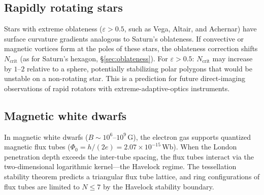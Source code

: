 \subsection{Rapidly rotating stars}

Stars with extreme oblateness ($\varepsilon > 0.5$, such as
Vega, Altair, and Achernar) have surface curvature gradients
analogous to Saturn's oblateness.  If convective or magnetic
vortices form at the poles of these stars, the oblateness
correction shifts $N_{\mathrm{crit}}$ (as for Saturn's hexagon,
\S\ref{sec:oblateness}).  For $\varepsilon > 0.5$:
$N_{\mathrm{crit}}$ may increase by $1$--$2$ relative to a
sphere, potentially stabilizing polar polygons that would be
unstable on a non-rotating star.
This is a prediction for future direct-imaging observations
of rapid rotators with extreme-adaptive-optics instruments.

\subsection{Magnetic white dwarfs}

In magnetic white dwarfs ($B \sim 10^6$--$10^9$\,G), the
electron gas supports quantized magnetic flux tubes
($\Phi_0 = h/(2e) = 2.07 \times 10^{-15}$\,Wb).
When the London penetration depth exceeds the inter-tube
spacing, the flux tubes interact via the two-dimensional
logarithmic kernel---the Havelock regime.
The tessellation stability theorem predicts a triangular
flux tube lattice, and ring configurations of flux tubes
are limited to $N \le 7$ by the Havelock stability boundary.




